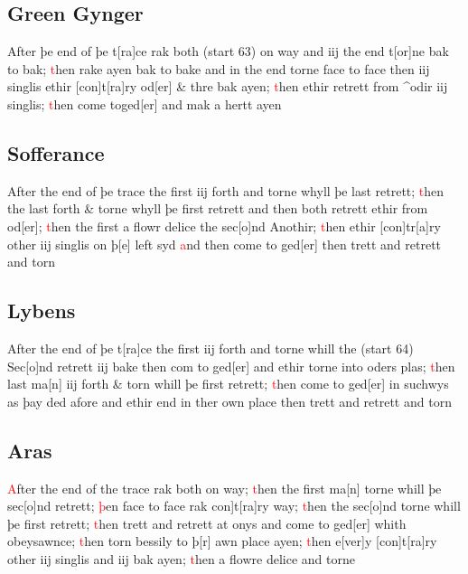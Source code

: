 \documentclass[12pt,letter]{article} %
\newcommand{\red}[1]{\textcolor{red}{#1}}
\newcommand{\srcpg}[1]{(start #1)}
\begin{document}
\subsection{Green Gynger}
After þe end of þe t{[}ra{]}ce rak both \srcpg{63} on way and iij the
end t{[}or{]}ne bak to bak; \red{t}hen rake ayen bak to bake and in the end
torne face to face then iij singlis ethir {[}con{]}t{[}ra{]}ry
od{[}er{]} \& thre bak ayen; \red{t}hen ethir retrett from \^{}odir iij
singlis; \red{t}hen come toged{[}er{]} and mak a hertt ayen

\subsection{Sofferance}
After the end of þe trace the first iij forth and torne whyll þe last
retrett; \red{t}hen the last forth \& torne whyll þe first retrett and then 
both retrett ethir from od{[}er{]}; \red{t}hen the first a flowr delice the
sec{[}o{]}nd Anothir; \red{t}hen ethir {[}con{]}tr{[}a{]}ry other iij singlis
on þ{[}e{]} left syd \red{a}nd then come to ged{[}er{]} then trett and retrett
and torn

\subsection{Lybens}
After the end of þe t{[}ra{]}ce the first iij forth and torne whill the
\srcpg{64} Sec{[}o{]}nd retrett iij bake then com to ged{[}er{]} and
ethir torne into oders plas; \red{t}hen last ma{[}n{]} iij forth \& torn whill
þe first retrett; \red{t}hen come to ged{[}er{]} in suchwys as þay ded afore
and ethir end in ther own place then trett and retrett and torn

\subsection{Aras}
\red{A}fter the end of the trace rak both on way; \red{t}hen the first ma{[}n{]}
torne whill þe sec{[}o{]}nd retrett; \red{þ}en face to face rak
\marginnote{2}{[}con{]}t{[}ra{]}ry way; \red{t}hen the sec{[}o{]}nd torne whill þe first
retrett; \red{t}hen trett and retrett at onys and come to ged{[}er{]} whith
obeysawnce; \red{t}hen torn bessily to þ{[}r{]} awn place ayen; \red{t}hen
e{[}ver{]}y {[}con{]}t{[}ra{]}ry other iij singlis and iij bak ayen;
\red{t}hen a flowre delice and torne
\end{document}
